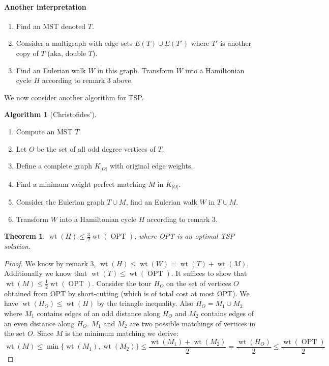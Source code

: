 \documentclass{article}
\newtheorem*{thm}{Theorem}
\theoremstyle{definition}
\newtheorem*{alg}{Algorithm}
\DeclareMathOperator{\wt}{wt}
\DeclareMathOperator{\OPT}{OPT}
\begin{document}

\paragraph{Another interpretation}
\begin{enumerate}
\item Find an MST denoted $T$.
\item Consider a multigraph with edge sets $E(T)\cup E(T')$ where $T'$ is another copy of $T$ (aka, double $T$).
\item Find an Eulerian walk $W$ in this graph.
Transform $W$ into a Hamiltonian cycle $H$ according to remark 3 above.
\end{enumerate}

We now consider another algorithm for TSP.

\begin{alg}[Christofides']~
\begin{enumerate}
\item Compute an MST $T$.
\item Let $O$ be the set of all odd degree vertices of $T$.
\item Define a complete graph $K_{|O|}$ with original edge weights.
\item Find a minimum weight perfect matching $M$ in $K_{|O|}$.
\item Consider the Eulerian graph $T\cup M$, find an Eulerian walk $W$ in $T\cup M$.
\item Transform $W$ into a Hamiltonian cycle $H$ according to remark 3.
\end{enumerate}
\end{alg}

\begin{thm}
$\wt(H)\le\frac{3}{2}\wt(\OPT)$, where OPT is an optimal TSP solution.
\end{thm}
\begin{proof}
We know by remark 3, $\wt(H) \le \wt(W) = \wt(T) + \wt(M)$.
Additionally we know that $\wt(T) \le \wt(\OPT)$.
It suffices to show that $\wt(M) \le \frac{1}{2}\wt(\OPT)$.
Consider the tour $H_O$ on the set of vertices $O$ obtained from OPT by short-cutting (which is of total cost at most OPT).
We have $\wt(H_O) \le \wt(H)$ by the triangle inequality.
Also $H_O = M_1\cup M_2$ where $M_1$ contains edges of an odd distance along $H_O$ and $M_2$ contains edges of an even distance along $H_O$. $M_1$ and $M_2$ are two possible matchings of vertices in the set $O$.
Since $M$ is the minimum matching we derive:
$$\wt(M) \le \min\{\wt(M_1),\wt(M_2)\} \le \frac{\wt(M_1)+\wt(M_2)}{2} = \frac{\wt(H_O)}{2} \le \frac{\wt(\OPT)}{2}$$
\end{proof}
\end{document}
